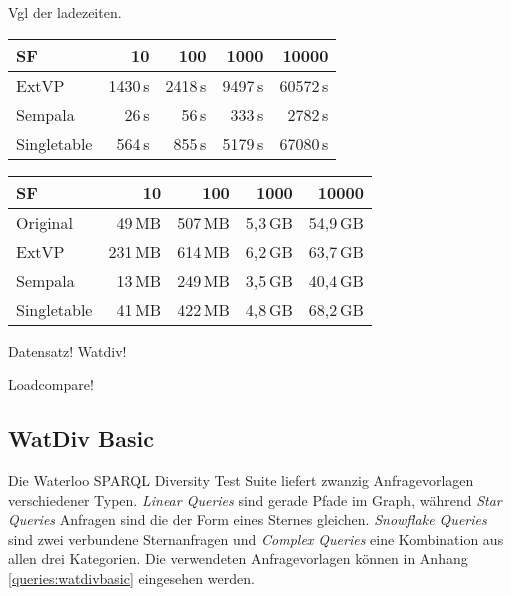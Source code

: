 \documentclass[
  a4paper,
  twocolumn
]{scrartcl}
\begin{document}
Vgl der ladezeiten.

\begin{table*}[htbp]
	\centering
	    \caption{Laufzeiten der Erstellung der Datenbanken.}
  	\label{figure:loader:time}
  	\begin{tabular*}{\textwidth}{ @{\extracolsep{\fill}} lrrrr }
		\toprule
		SF & 10 & 100 & 1000 & 10000 \\ 
		\midrule
		ExtVP & 1430\,s & 2418\,s & 9497\,s & 60572\,s \\ 
		Sempala & 26\,s & 56\,s & 333\,s & 2782\,s \\ 
		Singletable & 564\,s & 855\,s & 5179\,s & 67080\,s
  	\end{tabular*}
  	
    \caption{Speicherbedarf der Datenbanken.}
  	\label{figure:loader:space}
  	\begin{tabular*}{\textwidth}{ @{\extracolsep{\fill}} lrrrr }
		\toprule
		SF & 10 & 100 & 1000 & 10000 \\ 
		\midrule
		Original & 49\,MB & 507\,MB & 5,3\,GB & 54,9\,GB \\ 
		ExtVP & 231\,MB & 614\,MB & 6,2\,GB & 63,7\,GB \\ 
		Sempala & 13\,MB & 249\,MB & 3,5\,GB & 40,4\,GB \\ 
		Singletable & 41\,MB & 422\,MB & 4,8\,GB & 68,2\,GB 
  	\end{tabular*}
\end{table*}

Datensatz! Watdiv!

Loadcompare!

\lipsum[1-2]

\subsection{WatDiv Basic}

Die Waterloo SPARQL Diversity Test Suite liefert zwanzig Anfragevorlagen verschiedener Typen. \textit{Linear Queries} sind gerade Pfade im Graph, während \textit{Star Queries} Anfragen sind die der Form eines Sternes gleichen. \textit{Snowflake Queries} sind zwei verbundene Sternanfragen und \textit{Complex Queries} eine Kombination aus allen drei Kategorien. Die verwendeten Anfragevorlagen können in Anhang\,\ref{queries:watdivbasic} eingesehen werden.
\end{document}
